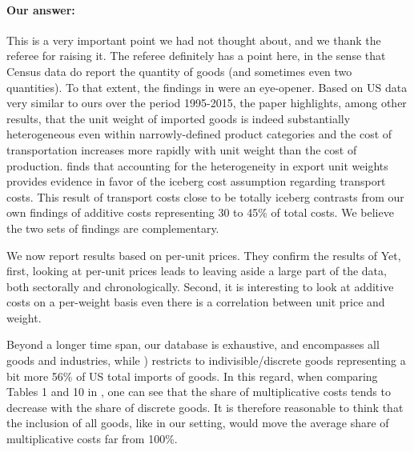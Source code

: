 \documentclass[a4paper,11pt]{article}
\begin{document}
\paragraph{Our answer:}
\noindent This is a very important point we had not thought about, and we thank the referee for raising it.
The referee definitely has a point here, in the sense that Census data do report the quantity of goods (and sometimes even two quantities).
To that extent, the findings in \cite{Lashkaripour_JIE2020} were an eye-opener.
Based on US data very similar to ours over the period 1995-2015, the paper highlights, among other results, that the unit weight of imported goods is indeed substantially heterogeneous even within narrowly-defined product categories and the cost of transportation increases more rapidly with unit weight than the cost of production.  \cite{Lashkaripour_JIE2020} finds that accounting for the heterogeneity in export unit weights provides evidence in favor of the iceberg cost assumption regarding transport costs.
This result of transport costs close to be totally iceberg contrasts from our own findings of additive costs representing 30 to 45\% of total costs.
We believe the two sets of findings are complementary.

We now report results based on per-unit prices.
They confirm the results of \cite{Lashkaripour_JIE2020}
Yet, first, looking at per-unit prices leads to leaving aside a large part of the data, both sectorally and chronologically.
Second,  it is interesting to look at additive costs on a per-weight basis even there is a correlation between unit price and weight.

Beyond a longer time span, our database is exhaustive, and encompasses all goods and industries, while \citet{Lashkaripour_JIE2020}) restricts to indivisible/discrete goods representing a bit more 56\% of US total imports of goods. In this regard, when comparing Tables 1 and 10 in \citet{Lashkaripour_JIE2020}, one can see that the share of multiplicative costs tends to decrease with the share of discrete goods. It is therefore reasonable to think that the inclusion of all goods, like in our setting, would move the average share of multiplicative costs far from 100\%.
\end{document}

